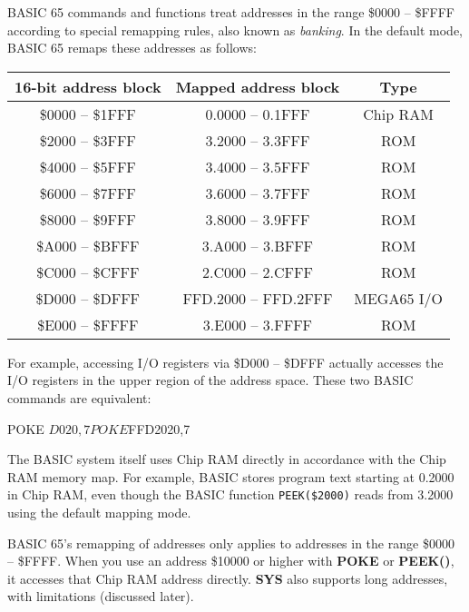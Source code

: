 \newpage

BASIC 65 commands and functions treat addresses in the range \$0000 -- \$FFFF
according to special remapping rules, also known as {\em banking}. In the
default mode, BASIC 65 remaps these addresses as follows:

\begin{center}
\begin{tabular}{|c|c|c|}
\hline
{\bf 16-bit address block} & {\bf Mapped address block} & {\bf Type} \\
\hline
\$0000 -- \$1FFF & 0.0000 -- 0.1FFF & Chip RAM \\
\hline
\$2000 -- \$3FFF & 3.2000 -- 3.3FFF & ROM \\
\hline
\$4000 -- \$5FFF & 3.4000 -- 3.5FFF & ROM \\
\hline
\$6000 -- \$7FFF & 3.6000 -- 3.7FFF & ROM \\
\hline
\$8000 -- \$9FFF & 3.8000 -- 3.9FFF & ROM \\
\hline
\$A000 -- \$BFFF & 3.A000 -- 3.BFFF & ROM \\
\hline
\$C000 -- \$CFFF & 2.C000 -- 2.CFFF & ROM \\
\hline
\$D000 -- \$DFFF & FFD.2000 -- FFD.2FFF & MEGA65 I/O\\
\hline
\$E000 -- \$FFFF & 3.E000 -- 3.FFFF & ROM \\
\hline
\end{tabular}
\end{center}

For example, accessing I/O registers via \$D000 -- \$DFFF actually accesses
the I/O registers in the upper region of the address space. These two BASIC
commands are equivalent:

\begin{basiccode}
POKE $D020,7

POKE $FFD2020,7
\end{basiccode}

The BASIC system itself uses Chip RAM directly in accordance with the Chip RAM
memory map. For example, BASIC stores program text starting at 0.2000 in Chip
RAM, even though the BASIC function \texttt{PEEK(\$2000)} reads from 3.2000 using
the default mapping mode.

BASIC 65's remapping of addresses only applies to addresses in the range \$0000
-- \$FFFF. When you use an address \$10000 or higher with {\bf POKE} or
{\bf PEEK()}, it accesses that Chip RAM address directly. {\bf SYS} also
supports long addresses, with limitations (discussed later).

